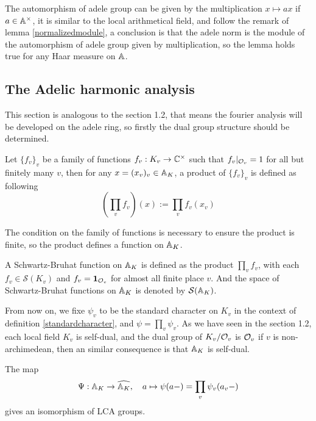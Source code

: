 \begin{remark}
    The automorphism of adele group can be given by the multiplication \(x \mapsto ax\) if \(a \in \mathbb{A}^\times\), it is similar to the local arithmetical field, and follow the remark of lemma \ref{normalizedmodule}, a conclusion is that the adele norm is the module of the automorphism of adele group given by multiplication, so the lemma holds true for any Haar measure on \(\mathbb{A}\).
\end{remark}

\subsection{The Adelic harmonic analysis}

This section is analogous to the section 1.2, that means the fourier analysis will be developed on the adele ring, so firstly the dual group structure should be determined.

\begin{definition}
    Let \(\{f_v\}_v\) be a family of functions \(f_v: K_v \to \mathbb{C}^\times\) such that \(f_v|_{\mathcal{O}_v} = 1\) for all but finitely many \(v\), then for any \(x = (x_v)_v \in \mathbb{A}_K\), a product of \(\{f_v\}_v\) is defined as following 
    \[(\prod_v f_v)(x) := \prod_vf_v(x_v)\]
\end{definition}

The condition on the family of functions is necessary to ensure the product is finite, so the product defines a function on \(\mathbb{A}_K\).

\begin{definition}
    A Schwartz-Bruhat function on \(\mathbb{A}_K\) is defined as the product \(\prod_v f_v\), with each \(f_v \in \mathcal{S}(K_v)\) and \(f_v = \mathbf{1}_{\mathcal{O}_v}\) for almost all finite place \(v\). And the space of Schwartz-Bruhat functions on \(\mathbb{A}_K\) is denoted by \(\mathcal{S}(\mathbb{A}_K)\).
\end{definition}

From now on, we fixe \(\psi_v\) to be the standard character on \(K_v\) in the context of definition \ref{standardcharacter}, and \(\psi = \prod_v \psi_v\). As we have seen in the section 1.2, each local field \(K_v\) is self-dual, and the dual group of \(K_v/\mathcal{O}_v\) is \(\mathcal{O}_v\) if \(v\) is non-archimedean, then an similar consequence is that \(\mathbb{A}_K\) is self-dual.

\begin{theorem}
    The map
    \[\Psi: \mathbb{A}_K \to \widehat{\mathbb{A}_K}, \quad a \mapsto \psi(a-) = \prod_v \psi_v(a_v -) \]
    gives an isomorphism of LCA groups.
\end{theorem}

